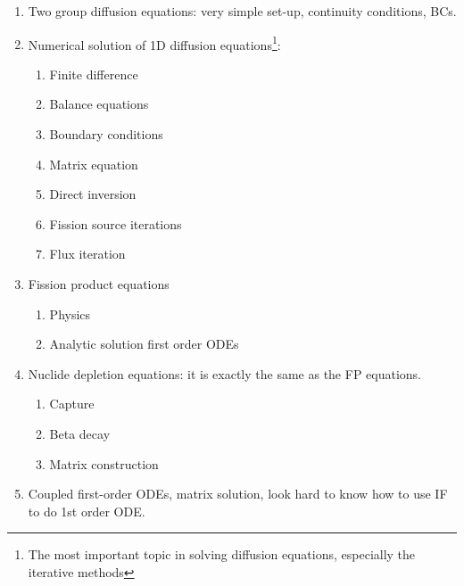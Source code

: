 \documentclass{school-22.211-notes}
\begin{document}
\begin{enumerate}
\item Two group diffusion equations: very simple set-up, continuity conditions, BCs. 

\item Numerical solution of 1D diffusion equations\footnote{The most important topic in solving diffusion equations, especially the iterative methods}: 
  \begin{enumerate}
  \item Finite difference
  \item Balance equations
  \item Boundary conditions
  \item Matrix equation
  \item Direct inversion
  \item Fission source iterations
  \item Flux iteration
  \end{enumerate}

\item Fission product equations
  \begin{enumerate}
  \item Physics
  \item Analytic solution first order ODEs
  \end{enumerate}

\item Nuclide depletion equations: it is exactly the same as the FP equations. 
  \begin{enumerate}
  \item Capture
  \item Beta decay
  \item Matrix construction
  \end{enumerate}

\item Coupled first-order ODEs, matrix solution, look hard to know how to use IF to do 1st order ODE. 
\end{enumerate}
\end{document}
